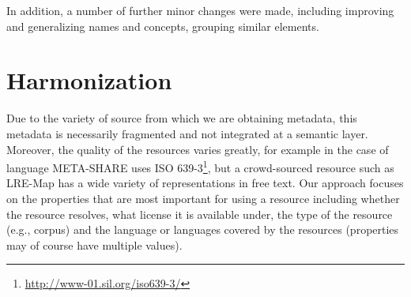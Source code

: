 \documentclass[smallextended]{svjour3}       %
\begin{document}
In addition, a number of further minor changes were made, including improving
and generalizing names and concepts, grouping similar elements.
%

\section{Harmonization}

\label{harmonization}

Due to the variety of source from which we are obtaining metadata, this metadata
is necessarily fragmented and not integrated at a semantic layer. Moreover, the quality of the
resources varies greatly, for example in the case of language META-SHARE uses
ISO 639-3\footnote{\url{http://www-01.sil.org/iso639-3/}}, but a crowd-sourced
resource such as LRE-Map has a wide variety of representations in free text. Our
approach focuses on the properties that are most important for using a resource
including whether the resource resolves, what license it is available under, the
type of the resource (e.g., corpus) and the language or languages covered by the
resources (properties may of course have multiple values).
\end{document}
